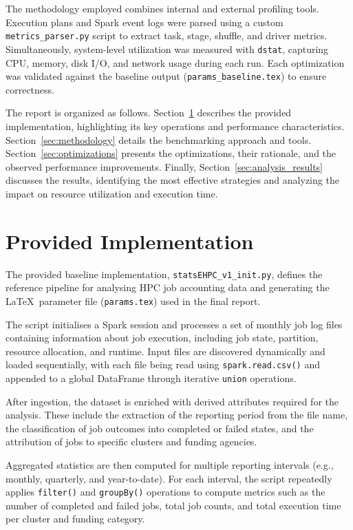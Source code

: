 \documentclass[conference,a4paper]{IEEEtran}
\begin{document}
The methodology employed combines internal and external profiling tools. Execution
plans and Spark event logs were parsed using a custom \texttt{metrics\_parser.py}
script to extract task, stage, shuffle, and driver metrics. Simultaneously,
system-level utilization was measured with \texttt{dstat}, capturing CPU, memory,
disk I/O, and network usage during each run. Each optimization was validated
against the baseline output (\texttt{params\_baseline.tex}) to ensure correctness.

The report is organized as follows. Section~\ref{sec:provided_implementation}
describes the provided implementation, highlighting its key operations and
performance characteristics. Section~\ref{sec:methodology} details the benchmarking
approach and tools. Section~\ref{sec:optimizations} presents the optimizations,
their rationale, and the observed performance improvements. Finally,
Section~\ref{sec:analysis_results} discusses the results, identifying the most
effective strategies and analyzing the impact on resource utilization and execution
time.

\section{Provided Implementation}
\label{sec:provided_implementation}

The provided baseline implementation, \texttt{statsEHPC\_v1\_init.py}, defines
the reference pipeline for analysing HPC job accounting data and generating the
\LaTeX\ parameter file (\texttt{params.tex}) used in the final report.

The script initialises a Spark session and processes a set of monthly job log
files containing information about job execution, including job state,
partition, resource allocation, and runtime. Input files are discovered
dynamically and loaded sequentially, with each file being read using
\texttt{spark.read.csv()} and appended to a global DataFrame through iterative
\texttt{union} operations.

After ingestion, the dataset is enriched with derived attributes required for
the analysis. These include the extraction of the reporting period from the file
name, the classification of job outcomes into completed or failed states, and
the attribution of jobs to specific clusters and funding agencies.

Aggregated statistics are then computed for multiple reporting intervals (e.g.,
monthly, quarterly, and year-to-date). For each interval, the script repeatedly
applies \texttt{filter()} and \texttt{groupBy()} operations to compute metrics
such as the number of completed and failed jobs, total job counts, and total
execution time per cluster and funding category.
\end{document}
